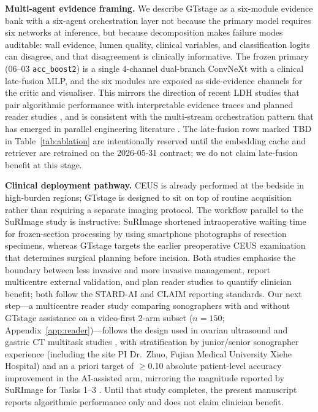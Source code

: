 \documentclass[11pt,a4paper]{article}
\begin{document}
\textbf{Multi-agent evidence framing.} We describe GTstage as a six-module evidence bank with a six-agent orchestration layer not because the primary model requires six networks at inference, but because decomposition makes failure modes auditable: wall evidence, lumen quality, clinical variables, and classification logits can disagree, and that disagreement is clinically informative. The frozen primary (06--03 \texttt{acc\_boost2}) is a single 4-channel dual-branch ConvNeXt with a clinical late-fusion MLP, and the six modules are exposed as side-evidence channels for the critic and visualiser. This mirrors the direction of recent LDH studies that pair algorithmic performance with interpretable evidence traces and planned reader studies \cite{gao2022ovarian, jiang2021stroma, sounderajah2022aipath}, and is consistent with the multi-stream orchestration pattern that has emerged in parallel engineering literature \cite{facadefixer2026, wang2024cvit}. The late-fusion rows marked TBD in Table~\ref{tab:ablation} are intentionally reserved until the embedding cache and retriever are retrained on the 2026-05-31 contract; we do not claim late-fusion benefit at this stage.

\textbf{Clinical deployment pathway.} CEUS is already performed at the bedside in high-burden regions; GTstage is designed to sit on top of routine acquisition rather than requiring a separate imaging protocol. The workflow parallel to the SuRImage study \cite{ldh_surimage2026} is instructive: SuRImage shortened intraoperative waiting time for frozen-section processing by using smartphone photographs of resection specimens, whereas GTstage targets the earlier preoperative CEUS examination that determines surgical planning before incision. Both studies emphasise the boundary between less invasive and more invasive management, report multicentre external validation, and plan reader studies to quantify clinician benefit; both follow the STARD-AI \cite{sounderajah2025stard} and CLAIM \cite{liu2020claim} reporting standards. Our next step---a multicentre reader study comparing sonographers with and without GTstage assistance on a video-first 2-arm subset ($n=150$; Appendix~\ref{app:reader})---follows the design used in ovarian ultrasound \cite{gao2022ovarian} and gastric CT multitask studies \cite{jiang2021stroma}, with stratification by junior/senior sonographer experience (including the site PI Dr.~Zhuo, Fujian Medical University Xiehe Hospital) and an a priori target of $\geq$0.10 absolute patient-level accuracy improvement in the AI-assisted arm, mirroring the magnitude reported by SuRImage for Tasks 1--3 \cite{ldh_surimage2026}. Until that study completes, the present manuscript reports algorithmic performance only and does not claim clinician benefit.
\end{document}
